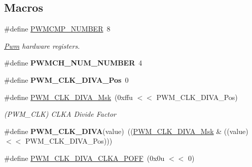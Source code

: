 \subsection*{Macros}
\begin{DoxyCompactItemize}
\item 
\mbox{\label{group__SAME70__PWM_gace381626974919cd4b1106113a792dd5}} 
\#define \mbox{\hyperlink{group__SAME70__PWM_gace381626974919cd4b1106113a792dd5}{P\+W\+M\+C\+M\+P\+\_\+\+N\+U\+M\+B\+ER}}~8
\begin{DoxyCompactList}\small\item\em \mbox{\hyperlink{structPwm}{Pwm}} hardware registers. \end{DoxyCompactList}\item 
\mbox{\label{group__SAME70__PWM_gaac490ccca2dabf7952b692754e13ef7a}} 
\#define {\bfseries P\+W\+M\+C\+H\+\_\+\+N\+U\+M\+\_\+\+N\+U\+M\+B\+ER}~4
\item 
\mbox{\label{group__SAME70__PWM_gafd838365b1e8ff1cd90d647ab9f91bc8}} 
\#define {\bfseries P\+W\+M\+\_\+\+C\+L\+K\+\_\+\+D\+I\+V\+A\+\_\+\+Pos}~0
\item 
\mbox{\label{group__SAME70__PWM_ga89c8665c750fe9e496bb150cfac30cd6}} 
\#define \mbox{\hyperlink{group__SAME70__PWM_ga89c8665c750fe9e496bb150cfac30cd6}{P\+W\+M\+\_\+\+C\+L\+K\+\_\+\+D\+I\+V\+A\+\_\+\+Msk}}~(0xffu $<$$<$ P\+W\+M\+\_\+\+C\+L\+K\+\_\+\+D\+I\+V\+A\+\_\+\+Pos)
\begin{DoxyCompactList}\small\item\em (P\+W\+M\+\_\+\+C\+LK) C\+L\+KA Divide Factor \end{DoxyCompactList}\item 
\mbox{\label{group__SAME70__PWM_ga16461ed8470a94e042b6b0c7b1eac316}} 
\#define {\bfseries P\+W\+M\+\_\+\+C\+L\+K\+\_\+\+D\+I\+VA}(value)~((\mbox{\hyperlink{group__SAMV71__PWM_ga89c8665c750fe9e496bb150cfac30cd6}{P\+W\+M\+\_\+\+C\+L\+K\+\_\+\+D\+I\+V\+A\+\_\+\+Msk}} \& ((value) $<$$<$ P\+W\+M\+\_\+\+C\+L\+K\+\_\+\+D\+I\+V\+A\+\_\+\+Pos)))
\item 
\mbox{\label{group__SAME70__PWM_gaf333c9ff5302685fd4ef18860428d30b}} 
\#define \mbox{\hyperlink{group__SAME70__PWM_gaf333c9ff5302685fd4ef18860428d30b}{P\+W\+M\+\_\+\+C\+L\+K\+\_\+\+D\+I\+V\+A\+\_\+\+C\+L\+K\+A\+\_\+\+P\+O\+FF}}~(0x0u $<$$<$ 0)
$$
\end{DoxyCompactItemize}

